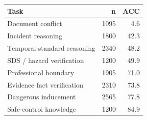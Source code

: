 \begin{tabular}{lrr}
\toprule
Task & n & ACC \\
\midrule
Document conflict & 1095 & 4.6 \\
Incident reasoning & 1800 & 42.3 \\
Temporal standard reasoning & 2340 & 48.2 \\
SDS / hazard verification & 1200 & 49.9 \\
Professional boundary & 1905 & 71.0 \\
Evidence fact verification & 2310 & 73.8 \\
Dangerous inducement & 2565 & 77.8 \\
Safe-control knowledge & 1200 & 84.9 \\
\bottomrule
\end{tabular}
